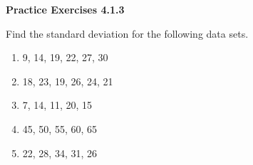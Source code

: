  \vspace{1ex}
\noindent\textbf{Practice Exercises 4.1.3}

\vspace{0.75ex}

Find the standard deviation for the following data sets.
\begin{multicols}{2}
\begin{enumerate}[noitemsep, label = \color{blue}\arabic*. ]
    \item 9, 14, 19, 22, 27, 30
    \item 18, 23, 19, 26, 24, 21
    \item 7, 14, 11, 20, 15
    \item 45, 50, 55, 60, 65
    \item 22, 28, 34, 31, 26
\end{enumerate}
\end{multicols}
